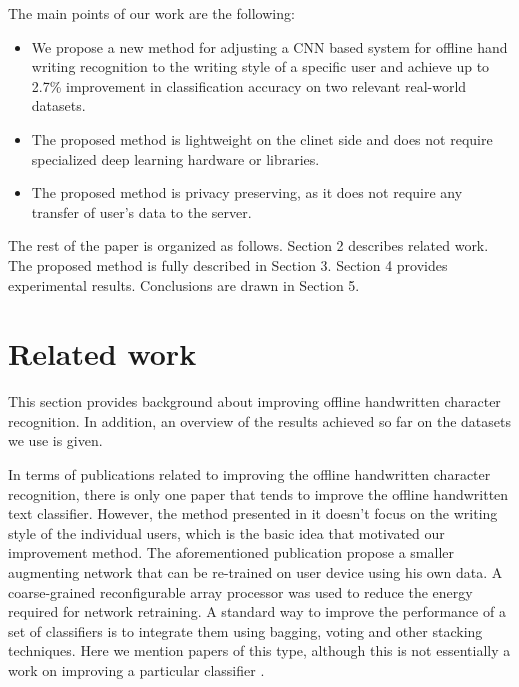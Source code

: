 \documentclass{article}
\begin{document}
The main points of our work are the following:
\begin{itemize}
\item We propose a new method for adjusting a CNN based system for offline hand writing recognition to the writing style of a specific user and achieve up to 2.7\% improvement in classification accuracy on two relevant real-world datasets.
\item The proposed method is lightweight on the clinet side and does not require specialized deep learning hardware or libraries.
\item The proposed method is privacy preserving, as it does not require any transfer of user's data to the server.
\end{itemize}

The rest of the paper is organized as follows. Section 2 describes related work. The proposed method is fully described in Section 3. Section 4 provides experimental results. Conclusions are drawn in Section 5.

\section{Related work}  %

This section provides background about improving offline handwritten character recognition.
In addition, an overview of the results achieved so far on the datasets we use is given.

In terms of publications related to improving the offline handwritten character recognition,
there is only one paper that tends to improve the offline handwritten text classifier.
However, the method presented in it doesn't focus on the writing style of the individual users, which is the basic idea that motivated our improvement method.
The aforementioned publication \citet{nist5} propose a smaller augmenting network that can be re-trained on user device using his own data. %
A coarse-grained reconfigurable array processor was used to reduce the energy required for network retraining.
A standard way to improve the performance of a set of classifiers is to integrate them using bagging, voting and other stacking techniques.
Here we mention papers of this type, although this is not essentially a work on improving a particular classifier \citet{imp1} \citet{imp2} \citet{imp3}.
\end{document}

